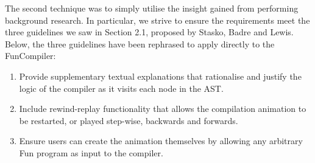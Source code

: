 \documentclass{l4proj}
\begin{document}
The second technique was to simply utilise the insight gained from performing background research. In particular, we strive to ensure the requirements meet the three guidelines we saw in Section 2.1, proposed by Stasko, Badre and Lewis. Below, the three guidelines have been rephrased to apply directly to the FunCompiler:
\begin{enumerate}[label=Guideline \alph*)]
\item Provide supplementary textual explanations that rationalise and justify the logic of the compiler as it visits each node in the AST.
\item Include rewind-replay functionality that allows the compilation animation to be restarted, or played step-wise, backwards and forwards.
\item Ensure users can create the animation themselves by allowing any arbitrary Fun program as input to the compiler.
\end{enumerate}
\pagebreak
\end{document}
